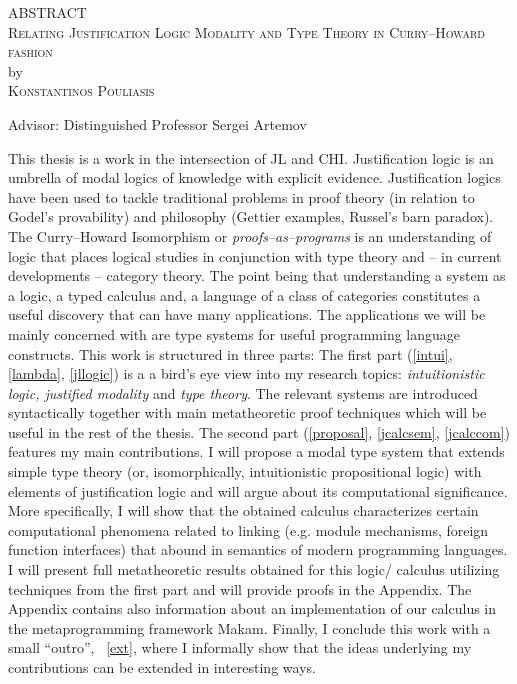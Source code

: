 \documentclass[letterpaper, 12pt, oneside]{book}
\begin{document}

\begin{center}
    ABSTRACT \\
    \textsc{Relating Justification Logic Modality and Type Theory in Curry--Howard fashion} \\
    by \\
    \textsc{Konstantinos Pouliasis} \\[0.15in]
    \end{center}
    
    \vspace{0.20in}
    
    \noindent Advisor: Distinguished Professor Sergei Artemov
    
    \vspace{0.20in}
    
    \noindent This thesis is a work in the intersection of \ac{JL} and \ac{CHI}. Justification logic is an umbrella of modal logics of knowledge with explicit evidence. 
    Justification logics have been used to tackle traditional problems in proof theory (in relation to Godel's provability) and philosophy (Gettier examples, Russel's barn paradox). 
    The Curry--Howard Isomorphism or \emph{proofs--as--programs} is an understanding of logic that places logical studies in conjunction with type theory and -- in current developments -- 
    category theory. The point being that  understanding a system as a logic, a typed calculus and,  a language of a class of categories constitutes a useful discovery 
    that can have many applications.
    The applications  we will be mainly concerned with  are type systems 
    for useful programming language constructs. 
    This work  is structured in three parts: 
    The first part (\cref{intui}, \cref{lambda}, \cref{jllogic}) is a  
    a bird's eye view into my 
    research topics:  
    \emph{intuitionistic logic, justified modality} and \emph{type theory}. 
    The relevant systems are introduced syntactically together with main 
     metatheoretic proof techniques which will be useful 
    in the rest of the thesis.
    The second part (\cref{proposal}, \cref{jcalcsem}, \cref{jcalccom}) 
    features my main contributions.
    I will propose  
    a modal type system that extends simple type theory
     (or, isomorphically, intuitionistic propositional logic) with elements of
     justification logic and will argue about its computational significance. 
     More specifically, I will show  
    that the obtained calculus characterizes  certain 
    computational phenomena related to linking (e.g. module mechanisms, foreign function interfaces) 
    that abound in semantics of modern programming languages. 
    I will present full metatheoretic
    results obtained for this logic/ calculus utilizing techniques from the first part 
    and will provide proofs in the Appendix. The Appendix contains also information about
    an implementation of our calculus in the metaprogramming framework {\sf Makam}.
    Finally, I conclude this work with a small ``outro'', ~\cref{ext},
    where I informally show that the ideas underlying my contributions 
    can be extended in interesting ways.
    
\end{document}

